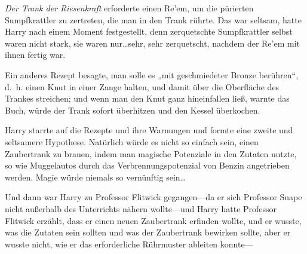 \emph{Der Trank der Riesenkraft} erforderte einen Re’em, um die pürierten Sumpfkrattler zu zertreten, die man in den Trank rührte. Das war seltsam, hatte Harry nach einem Moment festgestellt, denn zerquetschte Sumpfkrattler selbst waren nicht stark, sie waren nur…sehr, sehr zerquetscht, nachdem der Re’em mit ihnen fertig war.

Ein anderes Rezept besagte, man solle es „mit geschmiedeter Bronze berühren“, d.~h. einen Knut in einer Zange halten, und damit über die Oberfläche des Trankes streichen; und wenn man den Knut ganz hineinfallen ließ, warnte das Buch, würde der Trank sofort überhitzen und den Kessel überkochen.

Harry starrte auf die Rezepte und ihre Warnungen und formte eine zweite und seltsamere Hypothese. Natürlich würde es nicht so einfach sein, einen Zaubertrank zu brauen, indem man magische Potenziale in den Zutaten nutzte, so wie Muggelautos durch das Verbrennungspotenzial von Benzin angetrieben werden. Magie würde niemals so vernünftig sein…

Und dann war Harry zu Professor Flitwick gegangen—da er sich Professor Snape nicht außerhalb des Unterrichts nähern wollte—und Harry hatte Professor Flitwick erzählt, dass er einen neuen Zaubertrank erfinden wollte, und er wusste, was die Zutaten sein sollten und was der Zaubertrank bewirken sollte, aber er wusste nicht, wie er das erforderliche Rührmuster ableiten konnte—

